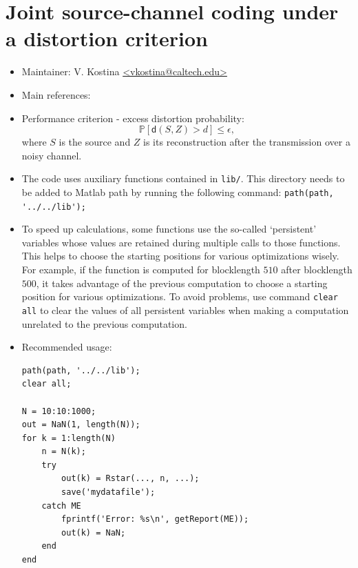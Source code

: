 \documentclass[a4paper,11p]{memoir}
\def\PP{\mathbb{P}}
\begin{document}
 
 
 
 
 
 
 
 
 
 
\chapter{Joint source-channel coding under a distortion criterion}

\begin{itemize}
\item Maintainer: V. Kostina \url{<vkostina@caltech.edu>}

\item Main references: \cite{kostina2012jscc}

\item Performance criterion - excess distortion probability: $$ \PP[ \mathsf d(S, Z) > d] \leq \epsilon,$$
where $S$ is the source and $Z$ is its reconstruction after the transmission over a noisy channel. 
\item The code uses auxiliary functions contained in \verb|lib/|. This directory needs to be added to Matlab path by running the following command: \verb|path(path, '../../lib');|

\item To speed up calculations, some functions use the so-called `persistent' variables whose values are retained during multiple calls to those functions. This helps to choose the starting positions for various optimizations wisely. For example, if the function is computed for blocklength $510$ after blocklength $500$, it takes advantage of the previous computation to choose a starting position for various optimizations. To avoid problems, use command \verb|clear all| to clear the values of all persistent variables when making a computation unrelated to the previous computation.    


\item Recommended usage: 
\begin{verbatim}
path(path, '../../lib');
clear all; 

N = 10:10:1000;
out = NaN(1, length(N));
for k = 1:length(N)
    n = N(k);  
    try
        out(k) = Rstar(..., n, ...);  
        save('mydatafile');  
    catch ME
        fprintf('Error: %s\n', getReport(ME));
        out(k) = NaN;
    end    
end
\end{verbatim}


\end{itemize}
\end{document}
